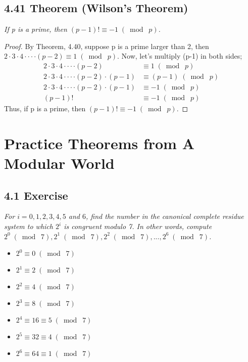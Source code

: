 \documentclass{article}
\begin{document}
\subsection*{4.41 Theorem (Wilson's Theorem)} 
\quad \textit{If p is a prime, then $(p-1)! \equiv -1 \;(\bmod\; p)$.}

\begin{proof}
By Theorem, 4.40, suppose p is a prime larger than 2, then $2 \cdot 3 \cdot 4 \cdot\cdot\cdot\cdot(p-2) \equiv 1 \;(\bmod\; p)$. Now, let's multiply (p-1) in both sides;
\begin{align*}
    &&2 \cdot 3 \cdot 4 \cdot\cdot\cdot\cdot(p-2) &\equiv 1 \;(\bmod\; p) &&\\
    &&2 \cdot 3 \cdot 4 \cdot\cdot\cdot\cdot(p-2)\cdot (p-1) &\equiv (p-1) \;(\bmod\; p) &&\\
    &&2 \cdot 3 \cdot 4 \cdot\cdot\cdot\cdot(p-2)\cdot (p-1) &\equiv -1 \;(\bmod\; p) &&\\
    &&(p-1)! &\equiv -1 \;(\bmod\; p) &&
\end{align*}
Thus, if p is a prime, then $(p-1)! \equiv -1 \;(\bmod\; p)$.
\end{proof}

\section*{Practice Theorems from A Modular World}

\subsection*{4.1 Exercise} 
\quad \textit{For $i = 0,1,2,3,4,5$ and $6$, find the number in the canonical complete residue system to which $2^i$ is congruent modulo 7. In other words, compute $2^0 \;(\bmod\; 7), 2^1 \;(\bmod\; 7), 2^2 \;(\bmod\; 7),...,2^6 \;(\bmod\; 7)$.}

\begin{itemize}
    \item $2^0 \equiv 0 \;(\bmod\; 7)$
    \item $2^1 \equiv 2 \;(\bmod\; 7)$
    \item $2^2 \equiv 4  \;(\bmod\; 7)$
    \item $2^3 \equiv 8  \;(\bmod\; 7)$
    \item $2^4 \equiv 16 \equiv 5 \;(\bmod\; 7)$
    \item $2^5 \equiv 32 \equiv 4 \;(\bmod\; 7)$
    \item $2^6 \equiv 64 \equiv 1 \;(\bmod\; 7)$
\end{itemize}
\end{document}
